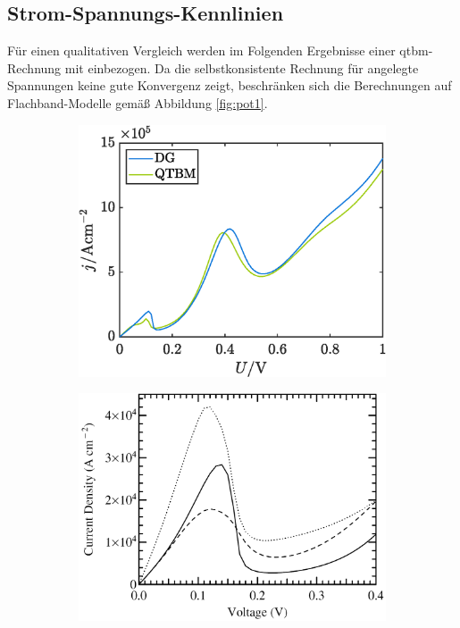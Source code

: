 \subsection{Strom-Spannungs-Kennlinien}
Für einen qualitativen Vergleich werden im Folgenden Ergebnisse einer \ac{qtbm}-Rechnung mit einbezogen. Da die selbstkonsistente Rechnung für angelegte Spannungen keine gute Konvergenz zeigt, beschränken sich die Berechnungen auf Flachband-Modelle gemäß Abbildung \ref{fig:pot1}.
\begin{figure}
    \centering
    \begin{subfigure}[b]{0.48\textwidth}
        \centering
        \includegraphics[width=\textwidth]{plots/IV/IV_qtbm_dg_grob.eps}
        \label{fig:iv1}
    \end{subfigure}
    \hfill
    \begin{subfigure}[b]{0.48\textwidth}
        \centering
        \includegraphics[width=\textwidth]{plots/IV/frensley.png}

\end{subfigure}
\end{figure}
